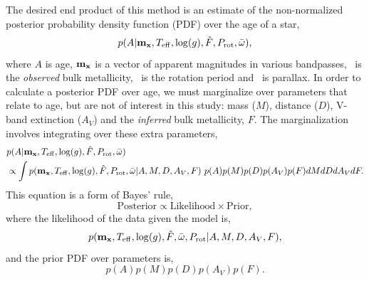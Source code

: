 The desired end product of this method is an estimate of the non-normalized
posterior probability density function (PDF) over the age of a star,
\begin{equation} \label{eqn:eqn1}
    p(A|{\bf m_x}, T_{\mathrm{eff}}, \log(g), \hat{F},
    P_{\mathrm{rot}}, \bar{\omega}),
\end{equation}
where $A$ is age, ${\bf m_x}$ is a vector of
apparent magnitudes in various bandpasses, \fhat\ is the {\it observed} bulk
metallicity, \prot\ is the rotation period and \pmega\ is parallax.
In order to calculate a posterior PDF over age, we must marginalize over
parameters that relate to age, but are not of interest in this study: mass
($M$), distance ($D$), V-band extinction ($A_V$) and the {\it inferred} bulk
metallicity, $F$.
The marginalization involves integrating over these extra parameters,
\begin{eqnarray} \label{eqn:bayes}
    & p(A|{\bf m_x}, T_{\mathrm{eff}}, \log(g), \hat{F},
    P_{\mathrm{rot}}, \bar{\omega})
\\ \nonumber
    & \propto \int p({\bf m_x}, T_{\mathrm{eff}}, \log(g), \hat{F},
    P_\mathrm{rot}, \bar{\omega}|
    A, M, D, A_V, F)~p(A)p(M)p(D)p(A_V)p(F)dMdDdA_VdF.
\end{eqnarray}
This equation is a form of Bayes' rule,
\begin{equation} \label{eqn:eqn2}
\mathrm{Posterior} \propto \mathrm{Likelihood} \times \mathrm{Prior},
\end{equation}
where the likelihood of the data given the model is,
\begin{equation} \label{eqn:full_likelihood}
    p({\bf m_x}, T_{\mathrm{eff}}, \log(g), \hat{F}, \bar{\omega},
    P_{\mathrm{rot}}|A, M, D, A_V, F),
\end{equation}
and the prior PDF over parameters is,
\begin{equation} \label{eqn:prior}
    p(A)p(M)p(D)p(A_V)p(F).
\end{equation}

